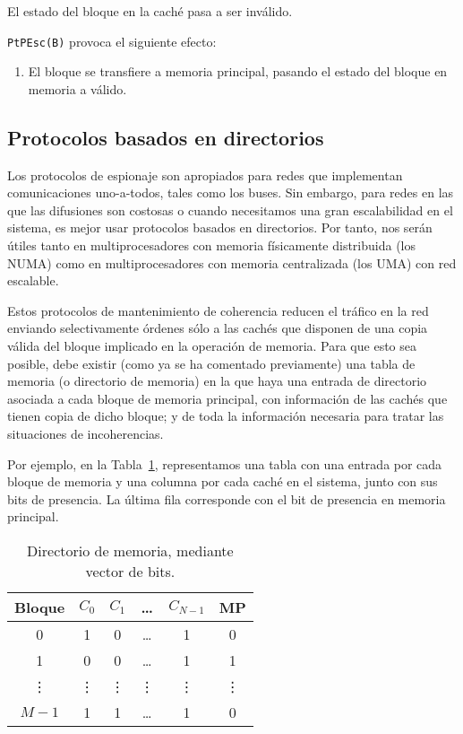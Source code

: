 \begin{description}
        El estado del bloque en la caché pasa a ser inválido.

        \verb|PtPEsc(B)| provoca el siguiente efecto:
        \begin{enumerate}
            \item El bloque se transfiere a memoria principal, pasando el estado del bloque en memoria a válido.
        \end{enumerate}
\end{description}

\subsection{Protocolos basados en directorios}
Los protocolos de espionaje son apropiados para redes que implementan comunicaciones uno-a-todos, tales como los buses. Sin embargo, para redes en las que las difusiones son costosas o cuando necesitamos una gran escalabilidad en el sistema, es mejor usar protocolos basados en directorios. Por tanto, nos serán útiles tanto en multiprocesadores con memoria físicamente distribuida (los NUMA) como en multiprocesadores con memoria centralizada (los UMA) con red escalable.

Estos protocolos de mantenimiento de coherencia reducen el tráfico en la red enviando selectivamente órdenes sólo a las cachés que disponen de una copia válida del bloque implicado en la operación de memoria. Para que esto sea posible, debe existir (como ya se ha comentado previamente) una tabla de memoria (o directorio de memoria) en la que haya una entrada de directorio asociada a cada bloque de memoria principal, con información de las cachés que tienen copia de dicho bloque; y de toda la información necesaria para tratar las situaciones de incoherencias. 

Por ejemplo, en la Tabla~\ref{tab:directorio_memoria}, representamos una tabla con una entrada por cada bloque de memoria y una columna por cada caché en el sistema, junto con sus bits de presencia. La última fila corresponde con el bit de presencia en memoria principal.\\

\begin{table}[H]
\centering
\begin{tabular}{c c c c c c}
    Bloque & $C_0$ & $C_1$ & \ldots & $C_{N-1}$ & MP \\
    \bottomrule
    0 & 1 & 0 & \ldots & 1 & 0 \\
    1 & 0 & 0 & \ldots & 1 & 1 \\
    \vdots & \vdots & \vdots & \vdots & \vdots & \vdots \\
    $M-1$ & 1 & 1 & \ldots & 1 & 0 \\
\end{tabular}
\caption{Directorio de memoria, mediante vector de bits.}
\label{tab:directorio_memoria}
\end{table}

